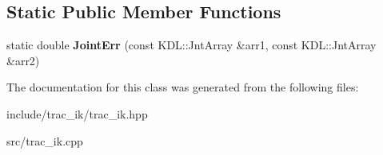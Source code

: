 \subsection*{Static Public Member Functions}
\begin{DoxyCompactItemize}
\item 
static double {\bfseries Joint\-Err} (const K\-D\-L\-::\-Jnt\-Array \&arr1, const K\-D\-L\-::\-Jnt\-Array \&arr2)\label{class_t_r_a_c___i_k_1_1_t_r_a_c___i_k_a13c5d0206917db768becab25c33f44af}

\end{DoxyCompactItemize}


The documentation for this class was generated from the following files\-:\begin{DoxyCompactItemize}
\item 
include/trac\-\_\-ik/trac\-\_\-ik.\-hpp\item 
src/trac\-\_\-ik.\-cpp\end{DoxyCompactItemize}
